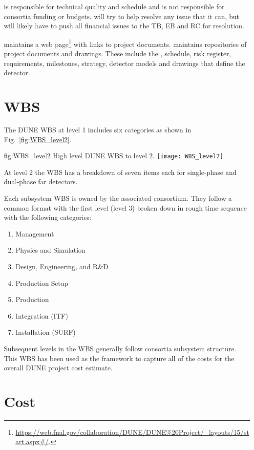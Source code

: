  is responsible for technical quality and schedule and is not
responsible for consortia funding or budgets.   will try to help
resolve any issue that it can, but will likely have to push all
financial issues to the TB, EB and RC for resolution.

 maintains a web
page\footnote{\url{https://web.fnal.gov/collaboration/DUNE/DUNE\%20Project/\_layouts/15/start.aspx\#/}.}
with links to project documents.  maintains repositories of
project documents and drawings. These include the ,
schedule, risk register, requirements, milestones, strategy, detector
models and drawings that define the  detector.

\section{WBS}
\label{sec:fdsp-coord-wbs}

The DUNE WBS at level 1 includes six categories as shown in
Fig.~\ref{fig:WBS_level2}.
\begin{dunefigure}{fig:WBS_level2}
  {High level DUNE WBS to level 2.}
  \texttt{[image: WBS\_level2]}
\end{dunefigure}
At level 2 the WBS has a breakdown of seven items
each for single-phase and dual-phase far detectors.

Each subsystem WBS is owned by the associated consortium. They follow a common format with the first level (level 3) broken down in rough time sequence with the following categories:
\begin{enumerate}
  \item Management
  \item Physics and Simulation
  \item Design, Engineering, and R\&D
  \item Production Setup
  \item Production
  \item Integration (ITF)
  \item Installation (SURF)
\end{enumerate}
Subsequent levels in the WBS generally follow consortia subsystem structure.
This WBS has been used as the framework to capture all of the costs
for the overall DUNE project cost estimate.

\section{Cost}
\label{sec:fdsp-coord-cost}

